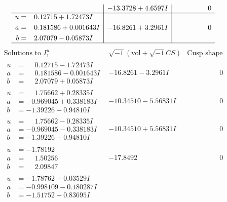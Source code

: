 \documentclass[1p]{elsarticle_modified}
\theoremstyle{definition}
\newcommand{\I}{\sqrt{-1}}
\begin{document}
$$\begin{array}{c|c|c}
 & -13.3728 + 4.6597 I & \phantom{-0.000000 } 0 \\ \hline\begin{aligned}
u &= \phantom{-}0.12715 + 1.72473 I \\
a &= \phantom{-}0.181586 + 0.001643 I \\
b &= \phantom{-}2.07079 - 0.05873 I\end{aligned}
 & -16.8261 + 3.2961 I & \phantom{-0.000000 } 0\\
 \hline 
 \end{array}$$\newpage$$\begin{array}{c|c|c}  
\text{Solutions to }I^u_{1}& \I (\text{vol} + \sqrt{-1}CS) & \text{Cusp shape}\\
 \hline 
\begin{aligned}
u &= \phantom{-}0.12715 - 1.72473 I \\
a &= \phantom{-}0.181586 - 0.001643 I \\
b &= \phantom{-}2.07079 + 0.05873 I\end{aligned}
 & -16.8261 - 3.2961 I & \phantom{-0.000000 } 0 \\ \hline\begin{aligned}
u &= \phantom{-}1.75662 + 0.28335 I \\
a &= -0.969045 + 0.338183 I \\
b &= -1.39226 - 0.94810 I\end{aligned}
 & -10.34510 - 5.56831 I & \phantom{-0.000000 } 0 \\ \hline\begin{aligned}
u &= \phantom{-}1.75662 - 0.28335 I \\
a &= -0.969045 - 0.338183 I \\
b &= -1.39226 + 0.94810 I\end{aligned}
 & -10.34510 + 5.56831 I & \phantom{-0.000000 } 0 \\ \hline\begin{aligned}
u &= -1.78192\phantom{ +0.000000I} \\
a &= \phantom{-}1.50256\phantom{ +0.000000I} \\
b &= \phantom{-}2.09847\phantom{ +0.000000I}\end{aligned}
 & -17.8492\phantom{ +0.000000I} & \phantom{-0.000000 } 0 \\ \hline\begin{aligned}
u &= -1.78762 + 0.03529 I \\
a &= -0.998109 - 0.180287 I \\
b &= -1.51752 + 0.83695 I\end{aligned}

\end{array}$$
\end{document}
